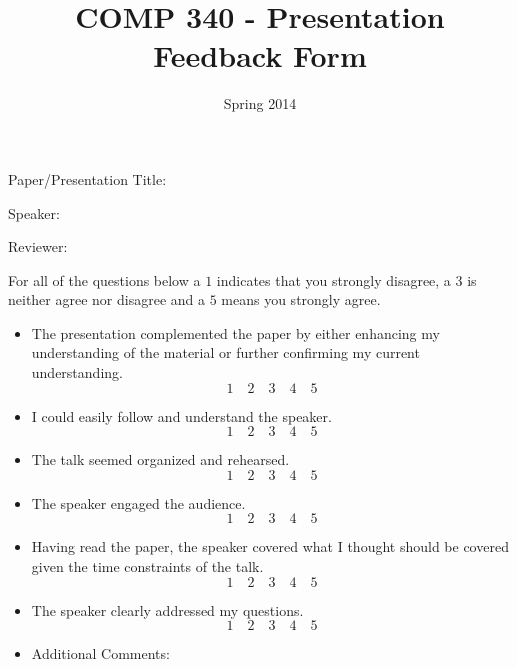 \documentclass[10pt]{article}
\title{COMP 340 - Presentation Feedback Form}
\author{  }
\date{Spring 2014}
\begin{document}
\maketitle \thispagestyle{empty}

Paper/Presentation Title: \underline{\hspace{4in}}
\vspace{.2in}

Speaker:\underline{\hspace{4in}}
\vspace{.2in}

Reviewer:\underline{\hspace{4in}}
\vspace{.1in}

For all of the questions below a $1$ indicates that you strongly disagree, a $3$ is neither agree nor disagree and a $5$ means you strongly agree.
\begin{itemize}
\item The presentation complemented the paper by either enhancing my understanding of the material or further confirming my current understanding.  
\[ 1 \quad 2 \quad 3 \quad 4 \quad 5\]
\item I could easily follow and understand the speaker.
\[ 1 \quad 2 \quad 3 \quad 4 \quad 5\]
\item The talk seemed organized and rehearsed. 
\[ 1 \quad 2 \quad 3 \quad 4 \quad 5\]
\item The speaker engaged the audience.
\[ 1 \quad 2 \quad 3 \quad 4 \quad 5\]
\item Having read the paper, the speaker covered what I thought should be covered given the time constraints of the talk.
\[ 1 \quad 2 \quad 3 \quad 4 \quad 5\]
\item The speaker clearly addressed my questions.
\[ 1 \quad 2 \quad 3 \quad 4 \quad 5\]
\item Additional Comments:
\end{itemize}
\end{document}
